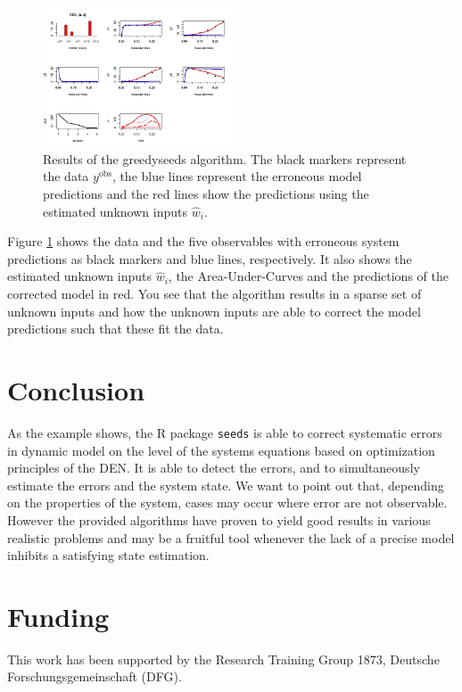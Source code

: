 \documentclass{bioinfo}
\begin{document}
	\begin{figure}[!tpb]
		\centerline{\includegraphics[width=0.5\textwidth]{Rplot.jpeg}}
		\caption{Results of the \textsf{greedyseeds} algorithm. The black markers represent 
		the data $y^\text{obs}$, the blue lines represent the erroneous model predictions and 
		the red lines show the predictions using the estimated unknown inputs $\hat{w}_i$.}
		\label{fig:example}
	\end{figure}

	Figure \ref{fig:example} shows the data and the five observables with erroneous system
	predictions as black markers and blue lines, respectively. It also shows the estimated 
	unknown inputs $\hat{w}_i$, the Area-Under-Curves and the predictions of the corrected 
	model in red. You see that the algorithm results in a sparse set of unknown inputs and how 
	the unknown inputs are able to correct the model predictions such that these fit the data.

\section{Conclusion}
	As the example shows, the R package \texttt{seeds} is able to correct systematic errors 
	in 
	dynamic model on the level of the systems equations based on optimization principles of 
	the DEN. It is able to detect the errors, and to simultaneously estimate the errors and 
	the system state. We want to point out that, depending on the properties of the system, 
	cases may occur where error are not observable. However the provided algorithms have 
	proven to yield good results in various realistic problems and may be a fruitful tool 
	whenever the lack of a precise model inhibits a satisfying state estimation.

\section*{Funding}
	This work has been supported by the Research Training Group 1873, Deutsche 
	Forschungsgemeinschaft (DFG).
\end{document}
